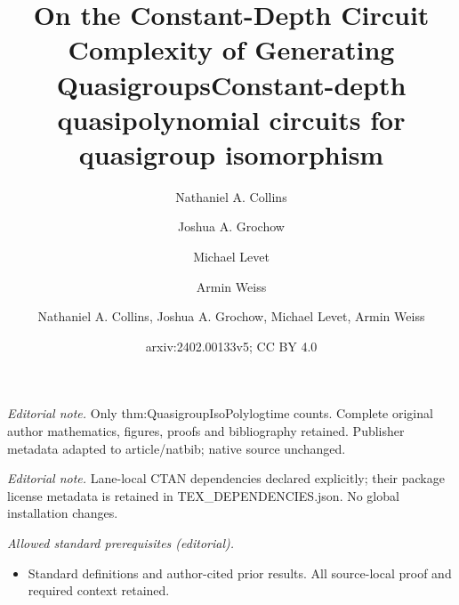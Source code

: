 \documentclass{article}
\title{On the Constant-Depth Circuit Complexity of Generating Quasigroups}
\author{Nathaniel A. Collins \and Joshua A. Grochow \and Michael Levet \and Armin Weiss}\date{}
\title{Constant-depth quasipolynomial circuits for quasigroup isomorphism}
\author{Nathaniel A. Collins, Joshua A. Grochow, Michael Levet, Armin Weiss}
\date{arxiv:2402.00133v5; CC BY 4.0}
\begin{document}
\maketitle
\noindent\textit{Editorial note.} Only thm:QuasigroupIsoPolylogtime counts. Complete original author mathematics, figures, proofs and bibliography retained. Publisher metadata adapted to article/natbib; native source unchanged.\par\medskip
\noindent\textit{Editorial note.} Lane-local CTAN dependencies declared explicitly; their package license metadata is retained in TEX\_DEPENDENCIES.json. No global installation changes.\par\medskip
\noindent\textit{Allowed standard prerequisites (editorial).}\begin{itemize}
\item Standard definitions and author-cited prior results. All source-local proof and required context retained.
\end{itemize}\medskip
\maketitle
\end{document}
